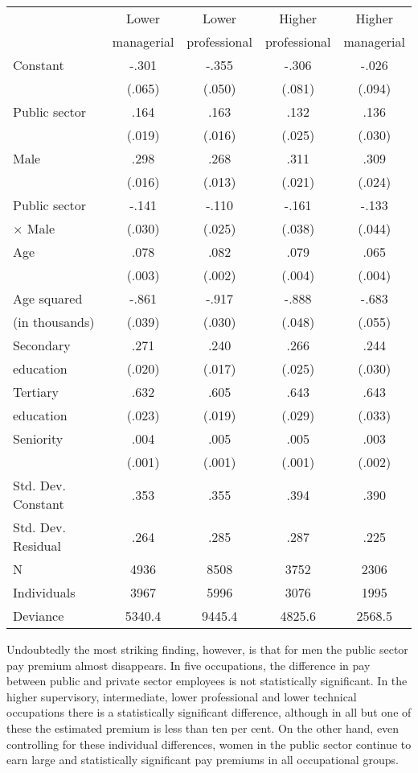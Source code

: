 \documentclass[a4paper,11pt,titlepage]{article}
\begin{document}
\begin{table}[t]
    \begin{tabularx}{\textwidth}{Ycccc}
    \toprule
			&Lower    & Lower &Higher &Higher \\
            & managerial & professional & professional & managerial \\
    \midrule
    Constant			&-.301	&-.355	&-.306	&-.026	   \\
    					&(.065)	&(.050)	&(.081)	&(.094)	    \\
    Public sector		&.164	&.163	&.132	& .136	\\
    					&(.019)	&(.016)	&(.025)	&(.030)	    \\
    Male				&.298	&.268	&.311	&.309	\\
    					&(.016)	&(.013)	&(.021)	&(.024)	\\
    Public sector		&-.141	&-.110	&-.161	&-.133	\\
    \quad $\times$ Male%
    					&(.030) &(.025)	&(.038)	&(.044)	\\
    Age					&.078	&.082	&.079	&.065	\\
    					&(.003)	&(.002)	&(.004)	&(.004)	\\
    Age squared			&-.861	&-.917	&-.888	&-.683	\\
    \quad (in thousands)%
    					&(.039) &(.030)	&(.048)	&(.055)	\\
    Secondary 			&.271	&.240	&.266	&.244	\\
    \quad education	    &(.020)	&(.017)	&(.025)	&(.030)	\\
    Tertiary			&.632	&.605	&.643	&.643	\\
    \quad education	    &(.023)	&(.019)	&(.029)	&(.033)	 \\
    Seniority			&.004	&.005	&.005	&.003	\\
    					&(.001)	&(.001)	&(.001)	&(.002)	\\
    \midrule
    Std. Dev. Constant  &.353   &.355	&.394	&.390	\\
    Std. Dev. Residual  &.264   &.285	&.287	&.225	\\
    N					&4936   &8508	&3752	&2306	\\
    Individuals			&3967   &5996	&3076	&1995	\\
    Deviance			&5340.4 &9445.4 &4825.6 &2568.5   \\
    \bottomrule
    \end{tabularx}
\end{table}

Undoubtedly the most striking finding, however, is that for men the public sector pay premium almost disappears.  In five occupations, the difference in pay between public and private sector employees is not statistically significant.  In the higher supervisory, intermediate, lower professional and lower technical occupations there is a statistically significant difference, although in all but one of these the estimated premium is less than ten per cent.  On the other hand, even controlling for these individual differences, women in the public sector continue to earn large and statistically significant pay premiums in all occupational groups.
\end{document}
